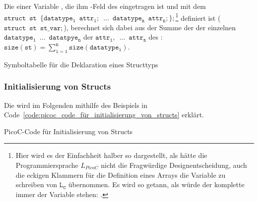 \begin{Special_Paragraph}
  Die  einer Variable , die ihm -Feld des  eingetragen ist und mit dem  $\mathtt{struct\enspace st\enspace \{datatype_1\enspace attr_1;\enspace\ldots\enspace datatype_n\enspace attr_n;\};}$\footnote{Hier wird es der Einfachheit halber so dargestellt, als hätte die Programmiersprache $L_{PicoC}$ nicht die Fragwürdige Designentscheidung, auch die eckigen Klammern \smalltt{[]} für die Definition eines Arrays  die Variable zu schreiben von $\mathtt{L_C}$ übernommen. Es wird so getann, als würde der komplette  immer  der Variable stehen: .} definiert ist ($\mathtt{struct\enspace st\enspace st\_var;}$), berechnet sich dabei aus der Summe der  der einzelnen  $\mathtt{datatype_1\enspace \ldots\enspace datatpye_n}$ der  $\mathtt{attr_1,\enspace \ldots\enspace attr_n}$ des  : $\mathtt{size(st) = \sum^n_{i=1} size(datatype_i)}$.
\end{Special_Paragraph}

\begin{code}
  \centering
  \caption{Symboltabelle für die Deklaration eines Structtyps}
  \label{code:symboltabelle_für_die_deklaration_eines_structtyps}
\end{code}

\subsubsection{Initialisierung von Structs}

Die  wird im Folgenden mithilfe des Beispiels in Code~\ref{code:picoc_code_für_initialisierung_von_structs} erklärt.

\begin{code}
  \centering
  \caption{PicoC-Code für Initialisierung von Structs}
  \label{code:picoc_code_für_initialisierung_von_structs}
\end{code}

